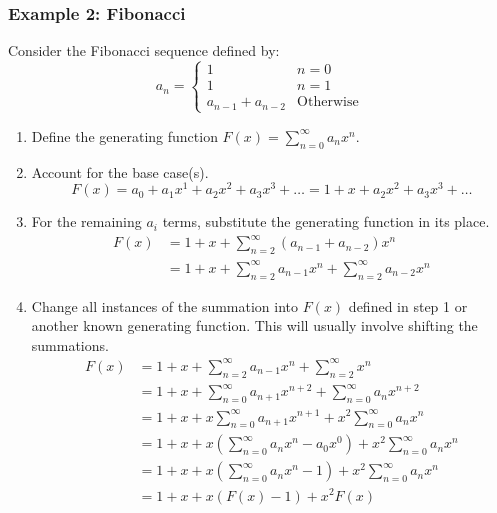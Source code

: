 \documentclass[letterpaper]{article}
\begin{document}
\subsubsection{Example 2: Fibonacci}
Consider the Fibonacci sequence defined by:
\[a_n = \begin{cases}
    1 & n = 0 \\ 
    1 & n = 1 \\ 
    a_{n - 1} + a_{n - 2} & \text{Otherwise}
\end{cases}\]

\begin{enumerate}[(1)]
    \item Define the generating function $F(x) = \sum_{n = 0}^{\infty} a_{n} x^{n}$. 
    \item Account for the base case(s). 
    \[F(x) = \boxed{a_0 + a_1 x^1} + a_2 x^2 + a_3 x^3 + \dots = \boxed{1 + x} + a_2 x^2 + a_3 x^3 + \dots\]
    
    \item For the remaining $a_i$ terms, substitute the generating function in its place. 
    \begin{equation*}
        \begin{aligned}
            F(x) &= 1 + x + \boxed{\sum_{n = 2}^{\infty} (a_{n - 1} + a_{n - 2}) x^n} \\ 
                &= 1 + x + \boxed{\sum_{n = 2}^{\infty} a_{n - 1} x^n + \sum_{n = 2}^{\infty} a_{n - 2} x^n}
        \end{aligned}
    \end{equation*}

    \item Change all instances of the summation into $F(x)$ defined in step 1 or another known generating function. This will usually involve shifting the summations.
    \begin{equation*}
        \begin{aligned}
            F(x) &= 1 + x + \sum_{n = 2}^{\infty} a_{n - 1} x^n + \sum_{n = 2}^{\infty} x^n \\ 
                &= 1 + x + \sum_{n = 0}^{\infty} a_{n + 1} x^{n + 2} + \sum_{n = 0}^{\infty} a_{n} x^{n + 2} \\ 
                &= 1 + x + x \sum_{n = 0}^{\infty} a_{n + 1} x^{n + 1} + x^2 \sum_{n = 0}^{\infty} a_n x^n \\ 
                &= 1 + x + x \left(\sum_{n = 0}^{\infty} a_n x^n - a_0 x^0\right) + x^2 \sum_{n = 0}^{\infty} a_n x^n \\ 
                &= 1 + x + x \left(\sum_{n = 0}^{\infty} a_n x^n - 1\right) + x^2 \sum_{n = 0}^{\infty} a_n x^n \\ 
                &= 1 + x + x \left(F(x) - 1\right) + x^2 F(x)
        \end{aligned}
    \end{equation*}


\end{enumerate}
\end{document}
